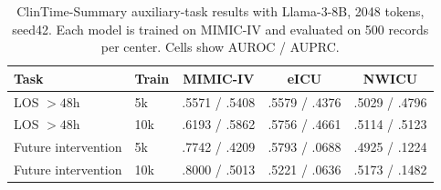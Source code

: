 \begin{table}[t]
\caption{ClinTime-Summary auxiliary-task results with Llama-3-8B, 2048 tokens, seed42. Each model is trained on MIMIC-IV and evaluated on 500 records per center. Cells show AUROC / AUPRC.}
\label{tab:summary_multitask}
\centering
\small
\setlength{\tabcolsep}{3.4pt}
\begin{tabular}{llccc}
\toprule
Task & Train & MIMIC-IV & eICU & NWICU \\
\midrule
LOS $>48$h & 5k  & .5571 / .5408 & .5579 / .4376 & .5029 / .4796 \\
LOS $>48$h & 10k & .6193 / .5862 & .5756 / .4661 & .5114 / .5123 \\
Future intervention & 5k  & .7742 / .4209 & .5793 / .0688 & .4925 / .1224 \\
Future intervention & 10k & .8000 / .5013 & .5221 / .0636 & .5173 / .1482 \\
\bottomrule
\end{tabular}
\end{table}

